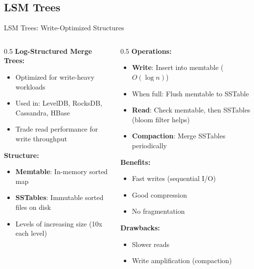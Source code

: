 \documentclass[aspectratio=169,xcolor=dvipsnames]{beamer}
\begin{document}
\subsection{LSM Trees}

\begin{frame}{LSM Trees: Write-Optimized Structures}
  \begin{columns}
    \begin{column}{0.5\textwidth}
      \textbf{Log-Structured Merge Trees:}
      \begin{itemize}
        \item Optimized for write-heavy workloads
        \item Used in: LevelDB, RocksDB, Cassandra, HBase
        \item Trade read performance for write throughput
      \end{itemize}

      \vspace{0.3cm}
      \textbf{Structure:}
      \begin{itemize}
        \item \textbf{Memtable}: In-memory sorted map
        \item \textbf{SSTables}: Immutable sorted files on disk
        \item Levels of increasing size (10x each level)
      \end{itemize}
    \end{column}

    \begin{column}{0.5\textwidth}
      \textbf{Operations:}
      \begin{itemize}
        \item \textbf{Write}: Insert into memtable ($O(\log n)$)
        \item When full: Flush memtable to SSTable
        \item \textbf{Read}: Check memtable, then SSTables (bloom filter helps)
        \item \textbf{Compaction}: Merge SSTables periodically
      \end{itemize}

      \vspace{0.3cm}
      \textbf{Benefits:}
      \begin{itemize}
        \item Fast writes (sequential I/O)
        \item Good compression
        \item No fragmentation
      \end{itemize}

      \vspace{0.3cm}
      \textbf{Drawbacks:}
      \begin{itemize}
        \item Slower reads
        \item Write amplification (compaction)
      \end{itemize}
    \end{column}
  \end{columns}
\end{frame}
\end{document}
